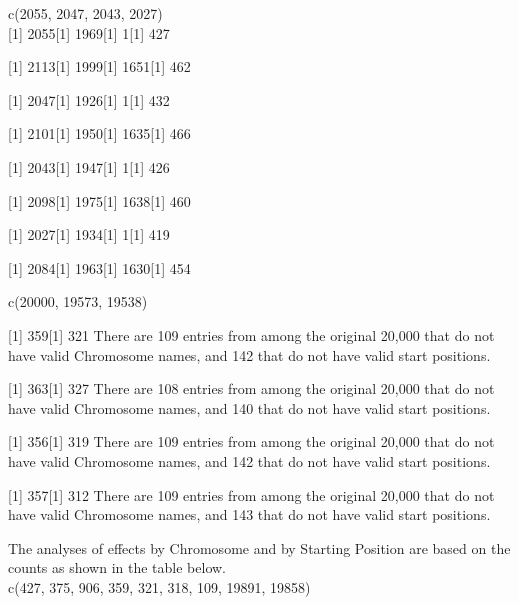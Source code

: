 \documentclass[11pt]{article}
\begin{document}



c(2055, 2047, 2043, 2027)\\





[1] 2055[1] 1969[1] 1[1] 427


[1] 2113[1] 1999[1] 1651[1] 462


[1] 2047[1] 1926[1] 1[1] 432


[1] 2101[1] 1950[1] 1635[1] 466



[1] 2043[1] 1947[1] 1[1] 426

[1] 2098[1] 1975[1] 1638[1] 460

[1] 2027[1] 1934[1] 1[1] 419

[1] 2084[1] 1963[1] 1630[1] 454

c(20000, 19573, 19538)

[1] 359[1] 321
There are 109 entries from among the original 20,000 that do not have valid Chromosome names, and 142 that do not have valid start positions.

[1] 363[1] 327
There are 108 entries from among the original 20,000 that do not have valid Chromosome names, and 140 that do not have valid start positions.


[1] 356[1] 319
There are 109 entries from among the original 20,000 that do not have valid Chromosome names, and 142 that do not have valid start positions.

[1] 357[1] 312
There are 109 entries from among the original 20,000 that do not have valid Chromosome names, and 143 that do not have valid start positions.




The analyses of effects by Chromosome and by Starting Position are based on the counts as shown in the table below.\\

c(427, 375, 906, 359, 321, 318, 109, 19891, 19858)
\end{document}
